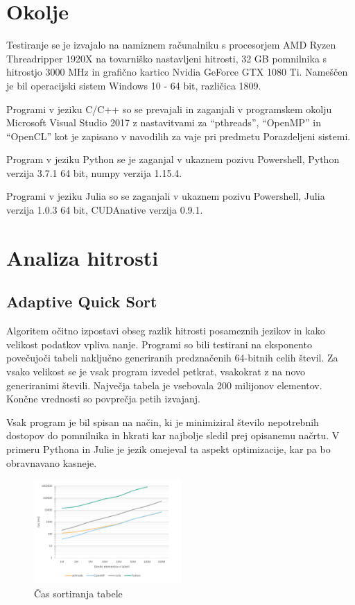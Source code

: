 \documentclass[journal,a4paper,twoside]{sty/IEEEtran}
\begin{document}
\section{Okolje}

Testiranje se je izvajalo na namiznem računalniku s procesorjem AMD Ryzen Threadripper 1920X na tovarniško nastavljeni hitrosti, 32 GB pomnilnika s hitrostjo
	3000 MHz in grafično kartico Nvidia GeForce GTX 1080 Ti.
Nameščen je bil operacijski sistem Windows 10 - 64 bit, različica 1809.

Programi v jeziku C/C++ so se prevajali in zaganjali v programskem okolju Microsoft Visual Studio 2017 z nastavitvami za “pthreads”, “OpenMP” in “OpenCL”
	kot je zapisano v navodilih za vaje pri predmetu Porazdeljeni sistemi.

Program v jeziku Python se je zaganjal v ukaznem pozivu Powershell, Python verzija 3.7.1 64 bit, numpy verzija 1.15.4.

Programi v jeziku Julia so se zaganjali v ukaznem pozivu Powershell, Julia verzija 1.0.3 64 bit, CUDAnative verzija 0.9.1.

\section{Analiza hitrosti}

\subsection{Adaptive Quick Sort}

Algoritem očitno izpostavi obseg razlik hitrosti posameznih jezikov in kako velikost podatkov vpliva nanje.
Programi so bili testirani na eksponento povečujoči tabeli naključno generiranih predznačenih 64-bitnih celih števil.
Za vsako velikost se je vsak program izvedel petkrat, vsakokrat z na novo generiranimi števili.
Največja tabela je vsebovala 200 milijonov elementov.
Končne vrednosti so povprečja petih izvajanj.

Vsak program je bil spisan na način, ki je minimiziral število nepotrebnih dostopov do pomnilnika in hkrati kar najbolje sledil prej opisanemu načrtu.
V primeru Pythona in Julie je jezik omejeval ta aspekt optimizacije, kar pa bo obravnavano kasneje.

\begin{figure}[h]
\includegraphics[width=0.5\textwidth]{aqs_speed}
\caption{Čas sortiranja tabele}
\end{figure}
\end{document}
